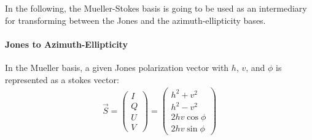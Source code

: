In the following, the Mueller-Stokes basis is going to be used as an intermediary for transforming between the Jones and the azimuth-ellipticity bases.

\paragraph*{Jones to Azimuth-Ellipticity}
In the Mueller basis, a given Jones polarization vector with $h$, $v$, and $\phi$ is represented as a stokes vector:
\begin{align}
    \vec S = \begin{pmatrix}
        I \\ Q \\ U \\ V
    \end{pmatrix} = 
    \begin{pmatrix}
      h^2 + v^2\\
      h^2 - v^2\\
      2hv \cos \phi\\
      2hv \sin \phi  
    \end{pmatrix}
\end{align}

